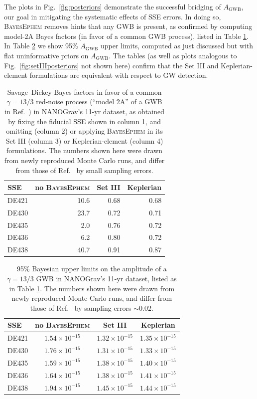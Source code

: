 \documentclass[reprint,
 amsmath,amssymb,
 aps,prd,floatfix,
]{revtex4-1}
\begin{document}
The plots in Fig.\ \ref{fig:posteriors} demonstrate the successful bridging of $A_\mathrm{GWB}$, our goal in mitigating the systematic effects of SSE errors. In doing so, \textsc{BayesEphem} removes hints that any GWB is present, as confirmed by computing model-2A Bayes factors (in favor of a common GWB process), listed in Table \ref{tab:bf}. In Table \ref{tab:upper} we show 95\% $A_\mathrm{GWB}$ upper limits, computed as just discussed but with flat uninformative priors on $A_\mathrm{GWB}$. The tables (as well as plots analogous to Fig.\ \ref{fig:setIIIposteriors} not shown here) confirm that the Set III and Keplerian-element formulations are equivalent with respect to GW detection.
%
\begin{table}[ht]
    \centering
    \begin{tabular}{l|r|r|r}
SSE & no \textsc{BayesEphem} & Set III & Keplerian \\
\hline
DE421 & 10.6 & 0.68 & 0.68 \\
DE430 & 23.7 & 0.72 & 0.71 \\
DE435 &  2.0 & 0.76 & 0.72 \\
DE436 &  6.2 & 0.80 & 0.72 \\
DE438 & 40.7 & 0.91 & 0.87
    \end{tabular}
    \caption{Savage--Dickey Bayes factors in favor of a common $\gamma=13/3$ red-noise process (``model 2A'' of a GWB in Ref.\ \cite{2018ApJ...859...47A}) in NANOGrav's 11-yr dataset, as obtained by fixing the fiducial SSE shown in column 1, and omitting (column 2) or applying \textsc{BayesEphem} in its Set III (column 3) or Keplerian-element (column 4) formulations. The numbers shown here were drawn from newly reproduced Monte Carlo runs, and differ from those of Ref.\ \cite{2018ApJ...859...47A} by small sampling errors.}
    \label{tab:bf}
\end{table}
%
\begin{table}[ht]
    \centering
    \begin{tabular}{l|c|c|c}
SSE & no \textsc{BayesEphem} & Set III & Keplerian \\
\hline
DE421 & $1.54 \times 10^{-15}$ & $1.32 \times 10^{-15}$ & $1.35 \times 10^{-15}$ \\
DE430 & $1.76 \times 10^{-15}$ & $1.31 \times 10^{-15}$ & $1.33 \times 10^{-15}$ \\
DE435 & $1.59 \times 10^{-15}$ & $1.38 \times 10^{-15}$ & $1.40 \times 10^{-15}$ \\
DE436 & $1.64 \times 10^{-15}$ & $1.38 \times 10^{-15}$ & $1.41 \times 10^{-15}$ \\
DE438 & $1.94 \times 10^{-15}$ & $1.45 \times 10^{-15}$ & $1.44 \times 10^{-15}$ \\
    \end{tabular}
    \caption{95\% Bayesian upper limits on the amplitude of a $\gamma=13/3$ GWB in NANOGrav's 11-yr dataset, listed as in Table \ref{tab:bf}. The numbers shown here were drawn from newly reproduced Monte Carlo runs, and differ from those of Ref.\ \cite{2018ApJ...859...47A} by sampling errors $\sim 0.02$.}
    \label{tab:upper}
\end{table}
\end{document}
